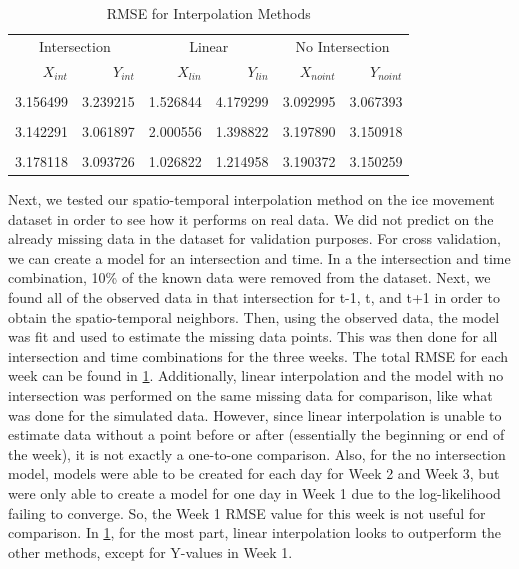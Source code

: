 \documentclass[12pt]{article}
\begin{document}
\begin{table}

\caption{\label{tab:results-table2}RMSE for Interpolation Methods}
\centering
\begin{tabular}[t]{rrrrrr}
\toprule
\multicolumn{2}{c}{Intersection} & \multicolumn{2}{c}{Linear} & \multicolumn{2}{c}{No Intersection} \\
\cmidrule(l{3pt}r{3pt}){1-2} \cmidrule(l{3pt}r{3pt}){3-4} \cmidrule(l{3pt}r{3pt}){5-6}
$X_{int}$ & $Y_{int}$ & $X_{lin}$ & $Y_{lin}$ & $X_{noint}$ & $Y_{noint}$\\
\midrule
\addlinespace[0.3em]
\multicolumn{6}{l}{\textbf{Week 1}}\\
\hspace{1em}3.156499 & 3.239215 & 1.526844 & 4.179299 & 3.092995 & 3.067393\\
\addlinespace[0.3em]
\multicolumn{6}{l}{\textbf{Week 2}}\\
\hspace{1em}3.142291 & 3.061897 & 2.000556 & 1.398822 & 3.197890 & 3.150918\\
\addlinespace[0.3em]
\multicolumn{6}{l}{\textbf{Week 3}}\\
\hspace{1em}3.178118 & 3.093726 & 1.026822 & 1.214958 & 3.190372 & 3.150259\\
\bottomrule
\end{tabular}
\end{table}

Next, we tested our spatio-temporal interpolation method on the ice
movement dataset in order to see how it performs on real data. We did
not predict on the already missing data in the dataset for validation
purposes. For cross validation, we can create a model for an
intersection and time. In a the intersection and time combination, 10\%
of the known data were removed from the dataset. Next, we found all of
the observed data in that intersection for t-1, t, and t+1 in order to
obtain the spatio-temporal neighbors. Then, using the observed data, the
model was fit and used to estimate the missing data points. This was
then done for all intersection and time combinations for the three
weeks. The total RMSE for each week can be found in
\cref{tab:results-table2}. Additionally, linear interpolation and the
model with no intersection was performed on the same missing data for
comparison, like what was done for the simulated data. However, since
linear interpolation is unable to estimate data without a point before
or after (essentially the beginning or end of the week), it is not
exactly a one-to-one comparison. Also, for the no intersection model,
models were able to be created for each day for Week 2 and Week 3, but
were only able to create a model for one day in Week 1 due to the
log-likelihood failing to converge. So, the Week 1 RMSE value for this
week is not useful for comparison. In \cref{tab:results-table2}, for the
most part, linear interpolation looks to outperform the other methods,
except for Y-values in Week 1.
\end{document}
